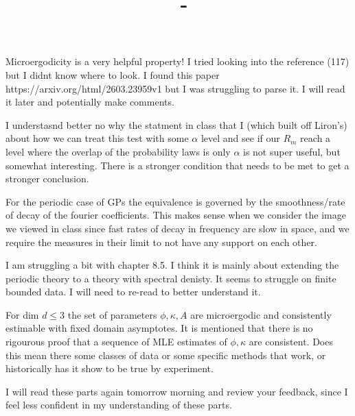 \documentclass[answers,12pt,addpoints]{exam}
\author{\name}
\title{\course \ - \assignment}
\begin{document}
\maketitle

\begin{questions}
\question Microergodicity is a very helpful property! I tried looking into the reference (117) but I didnt know where to look. I found this paper https://arxiv.org/html/2603.23959v1 but I was struggling to parse it. I will read it later and potentially make comments. 

\question I understasnd better no why the statment in class that I (which built off Liron's) about how we can treat this test with some $\alpha$ level and see if our $R_m$ reach a level where the overlap of the probability laws is only $\alpha$ is not super useful, but somewhat interesting. There is a stronger condition that needs to be met to get a stronger conclusion. 

\question For the periodic case of GPs the equivalence is governed by the smoothness/rate of decay of the fourier coefficients. This makes sense when we consider the image we viewed in class since fast rates of decay in frequency are slow in space, and we require the measures in their limit to not have any support on each other. 

\question I am struggling a bit with chapter 8.5. I think it is mainly about extending the periodic theory to a theory with spectral denisty. It seems to struggle on finite bounded data. I will need to re-read to better understand it. 

\question For dim $d \leq 3$ the set of parameters $\phi, \kappa, A$ are microergodic and consistently estimable with fixed domain asymptotes. It is mentioned that there is no rigourous proof that a sequence of MLE estimates of $\phi,\kappa$ are consistent. Does this mean there some classes of data or some specific methods that work, or historically has it show to be true by experiment. 

\question I will read these parts again tomorrow morning and review your feedback, since I feel less confident in my understanding of these parts. 


\end{questions}
\end{document}
